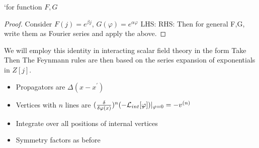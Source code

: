 \documentclass{article}
\begin{document}
\begin{prop}
`for function $F,G$
\end{prop}
\begin{proof}
Consider $F(j)=e^{\beta j}$, $G(\varphi)=e^{\alpha\varphi}$
LHS:
RHS:
Then for general F,G, write them as Fourier series and apply the above. 
\end{proof}
We will employ this identity in interacting scalar field theory in the form 
Take 
Then 
The Feynmann rules are then based on the series expansion of exponentials in $Z[j]$. 
\begin{itemize}
    \item Propagators are $\Delta(x-x^\prime)$
    \item Vertices with $n$ lines are $(\frac{\delta}{\delta \varphi(x)})^n (-\mathcal{L}_{int} [\varphi])|_{\varphi=0} = -v^{(n)}$
    \item Integrate over all positions of internal vertices 
    \item Symmetry factors as before 
\end{itemize}
\end{document}
